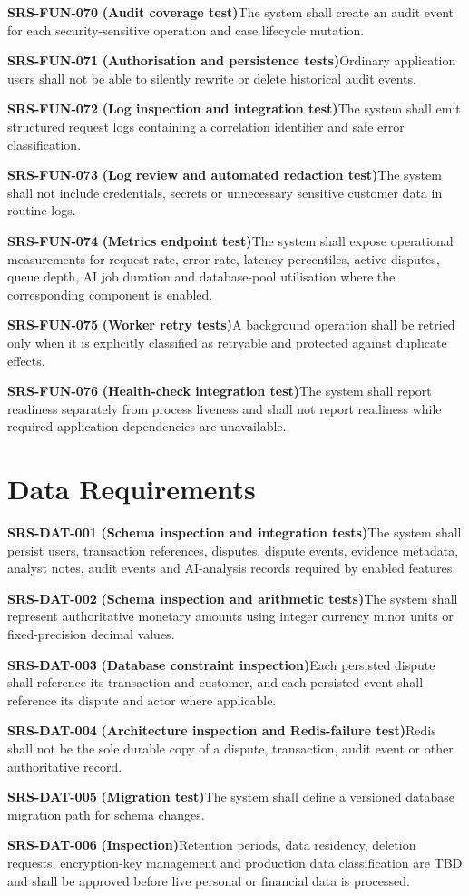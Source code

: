 \documentclass[11pt,a4paper]{article}
\newcommand{\req}[3]{%
    \par\noindent\textbf{\color{ADGBlue}#1}\quad
    \textbf{(#3)}\enspace #2\par\smallskip
}
\begin{document}
\req{SRS-FUN-070}{The system shall create an audit event for each security-sensitive operation and case lifecycle mutation.}{Audit coverage test}
\req{SRS-FUN-071}{Ordinary application users shall not be able to silently rewrite or delete historical audit events.}{Authorisation and persistence tests}
\req{SRS-FUN-072}{The system shall emit structured request logs containing a correlation identifier and safe error classification.}{Log inspection and integration test}
\req{SRS-FUN-073}{The system shall not include credentials, secrets or unnecessary sensitive customer data in routine logs.}{Log review and automated redaction test}
\req{SRS-FUN-074}{The system shall expose operational measurements for request rate, error rate, latency percentiles, active disputes, queue depth, AI job duration and database-pool utilisation where the corresponding component is enabled.}{Metrics endpoint test}
\req{SRS-FUN-075}{A background operation shall be retried only when it is explicitly classified as retryable and protected against duplicate effects.}{Worker retry tests}
\req{SRS-FUN-076}{The system shall report readiness separately from process liveness and shall not report readiness while required application dependencies are unavailable.}{Health-check integration test}

\section{Data Requirements}

\req{SRS-DAT-001}{The system shall persist users, transaction references, disputes, dispute events, evidence metadata, analyst notes, audit events and AI-analysis records required by enabled features.}{Schema inspection and integration tests}
\req{SRS-DAT-002}{The system shall represent authoritative monetary amounts using integer currency minor units or fixed-precision decimal values.}{Schema inspection and arithmetic tests}
\req{SRS-DAT-003}{Each persisted dispute shall reference its transaction and customer, and each persisted event shall reference its dispute and actor where applicable.}{Database constraint inspection}
\req{SRS-DAT-004}{Redis shall not be the sole durable copy of a dispute, transaction, audit event or other authoritative record.}{Architecture inspection and Redis-failure test}
\req{SRS-DAT-005}{The system shall define a versioned database migration path for schema changes.}{Migration test}
\req{SRS-DAT-006}{Retention periods, data residency, deletion requests, encryption-key management and production data classification are TBD and shall be approved before live personal or financial data is processed.}{Inspection}
\end{document}
